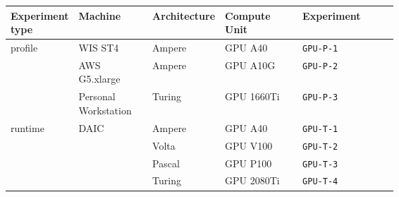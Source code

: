 \begin{tabular}{p{0.15\linewidth}p{0.19\linewidth}p{0.10\linewidth}p{0.20\linewidth}l}
    \toprule
    Experiment type                                                 & Machine                                                         & \hspace{0pt}Architecture                                  & Compute Unit           & Experiment       \\
    \midrule\midrule
    \multirow[t]{3}{*}{\parbox{1\linewidth}{\vspace{1.5cm}profile}} & WIS ST4                                                         & Ampere                                                    & GPU A40                & \texttt{GPU-P-1} \\
    \cline{2-5}
                                                                    & AWS G5.xlarge                                                   & Ampere                                                    & GPU A10G               & \texttt{GPU-P-2} \\
    \cline{2-5}
                                                                    & Personal Workstation                                            & Turing                                                    & GPU 1660Ti             & \texttt{GPU-P-3} \\
    \cline{1-5}
    \multirow[t]{8}{*}{\parbox{1\linewidth}{\vspace{4cm}runtime}}   & \multirow[t]{5}{*}{\parbox{1\linewidth}{\vspace{2cm}DAIC}}      & Ampere                                                    & GPU A40                & \texttt{GPU-T-1} \\

                                                                    &                                                                 & Volta                                                     & GPU V100               & \texttt{GPU-T-2} \\

                                                                    &                                                                 & Pascal                                                    & GPU P100               & \texttt{GPU-T-3} \\

                                                                    &                                                                 & Turing                                                    & GPU 2080Ti             & \texttt{GPU-T-4} \\


\end{tabular}
